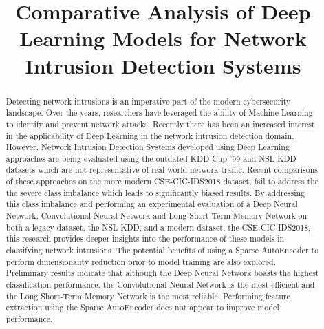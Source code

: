 \documentclass[conference]{IEEEtran}
\begin{document}
\title{Comparative Analysis of Deep Learning Models for Network Intrusion Detection Systems}

\author{
\and
{}
}

\maketitle



\raggedbottom

\begin{abstract}
\noindet Detecting network intrusions is an imperative part of the modern cybersecurity landscape. Over the years, researchers have leveraged the ability of Machine Learning to identify and prevent network attacks. Recently there has been an increased interest in the applicability of Deep Learning in the network intrusion detection domain. However, Network Intrusion Detection Systems developed using Deep Learning approaches are being evaluated using the outdated KDD Cup '99 and NSL-KDD datasets which are not representative of real-world network traffic. Recent comparisons of these approaches on the more modern CSE-CIC-IDS2018 dataset, fail to address the the severe class imbalance which leads to significantly biased results. By addressing this class imbalance and performing an experimental evaluation of a Deep Neural Network, Convolutional Neural Network and Long Short-Term Memory Network on both a legacy dataset, the NSL-KDD, and a modern dataset, the CSE-CIC-IDS2018, this research provides deeper insights into the performance of these models in classifying network intrusions. The potential benefits of using a Sparse AutoEncoder to perform dimensionality reduction prior to model training are also explored. Preliminary results indicate that although the Deep Neural Network boasts the highest classification performance, the Convolutional Neural Network is the most efficient and the Long Short-Term Memory Network is the most reliable. Performing feature extraction using the Sparse AutoEncoder does not appear to improve model performance. 
\end{abstract}
\end{document}
